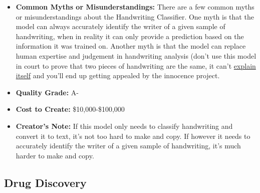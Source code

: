 \begin{itemize}
\begin{itemize}
    \item \textbf{Common Myths or Misunderstandings:} There are a few common myths or misunderstandings about the Handwriting Classifier. One myth is that the model can always accurately identify the writer of a given sample of handwriting, when in reality it can only provide a prediction based on the information it was trained on. Another myth is that the model can replace human expertise and judgement in handwriting analysis (don't use this model in court to prove that two pieces of handwriting are the same, it can't \hyperref[sec:explain]{explain itself} and you'll end up getting appealed by the innocence project.
    \item \textbf{Quality Grade:} A-
    \item \textbf{Cost to Create:} \$10,000-\$100,000
    \item \textbf{Creator's Note:} If this model only needs to classify handwriting and convert it to text, it's not too hard to make and copy. If however it needs to accurately identify the writer of a given sample of handwriting, it's much harder to make and copy.
\end{itemize}

\subsection{Drug Discovery}


\end{itemize}
